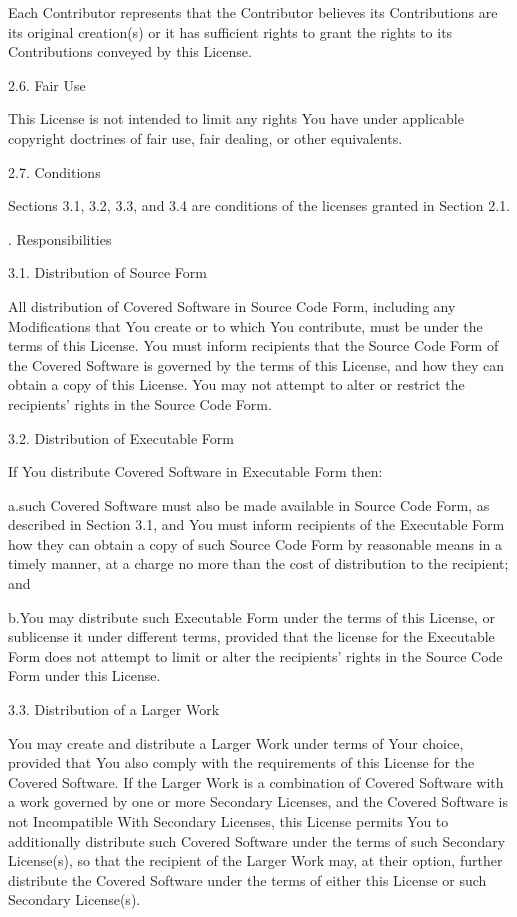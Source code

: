 Each Contributor represents that the Contributor believes its Contributions are its original creation(s) or it has sufficient rights to grant the rights to its Contributions conveyed by this License.

2.6. Fair Use

This License is not intended to limit any rights You have under applicable copyright doctrines of fair use, fair dealing, or other equivalents.

2.7. Conditions

Sections 3.1, 3.2, 3.3, and 3.4 are conditions of the licenses granted in Section 2.1.

. Responsibilities

3.1. Distribution of Source Form

All distribution of Covered Software in Source Code Form, including any Modifications that You create or to which You contribute, must be under the terms of this License. You must inform recipients that the Source Code Form of the Covered Software is governed by the terms of this License, and how they can obtain a copy of this License. You may not attempt to alter or restrict the recipients’ rights in the Source Code Form.

3.2. Distribution of Executable Form

If You distribute Covered Software in Executable Form then:

a.such Covered Software must also be made available in Source Code Form, as described in Section 3.1, and You must inform recipients of the Executable Form how they can obtain a copy of such Source Code Form by reasonable means in a timely manner, at a charge no more than the cost of distribution to the recipient; and

b.You may distribute such Executable Form under the terms of this License, or sublicense it under different terms, provided that the license for the Executable Form does not attempt to limit or alter the recipients’ rights in the Source Code Form under this License.

3.3. Distribution of a Larger Work

You may create and distribute a Larger Work under terms of Your choice, provided that You also comply with the requirements of this License for the Covered Software. If the Larger Work is a combination of Covered Software with a work governed by one or more Secondary Licenses, and the Covered Software is not Incompatible With Secondary Licenses, this License permits You to additionally distribute such Covered Software under the terms of such Secondary License(s), so that the recipient of the Larger Work may, at their option, further distribute the Covered Software under the terms of either this License or such Secondary License(s).

